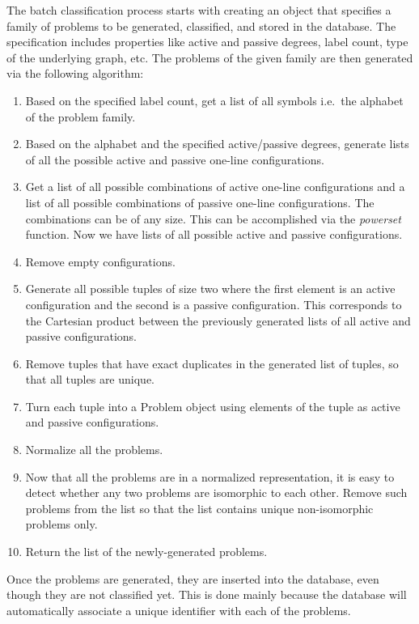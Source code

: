 The batch classification process starts with creating
an object that specifies a family of problems to be
generated, classified, and stored in the database.
The specification includes properties like
active and passive degrees, label count, type of the
underlying graph, etc. The problems of the given
family are then generated via the following algorithm:

\begin{enumerate}
  \item Based on the specified label count, get a list of
  all symbols i.e.\ the alphabet of the problem family.
  \item Based on the alphabet and the specified active/passive
  degrees, generate lists of all the possible
  active and passive one-line configurations.
  \item Get a list of all possible combinations
  of active one-line configurations and a list of all possible
  combinations of passive one-line configurations. The combinations
  can be of any size. This can be accomplished via
  the \emph{powerset} function. Now we have lists of
  all possible active and passive configurations.
  \item Remove empty configurations.
  \item Generate all possible tuples of size two
  where the first element is an active configuration and
  the second is a passive configuration. This corresponds
  to the Cartesian product between the previously generated
  lists of all active and passive configurations.
  \item Remove tuples that have exact duplicates in the
  generated list of tuples, so that all tuples are unique.
  \item Turn each tuple into a Problem object using
  elements of the tuple as active and passive configurations.
  \item Normalize all the problems.
  \item Now that all the problems are in a normalized 
  representation, it is easy to detect whether any two
  problems are isomorphic to each other. Remove such
  problems from the list so that the list contains
  unique non-isomorphic problems only.
  \item Return the list of the newly-generated problems.
\end{enumerate}

Once the problems are generated, they are inserted into the database,
even though they are not classified yet. This is done mainly
because the database will automatically associate a unique
identifier with each of the problems.

